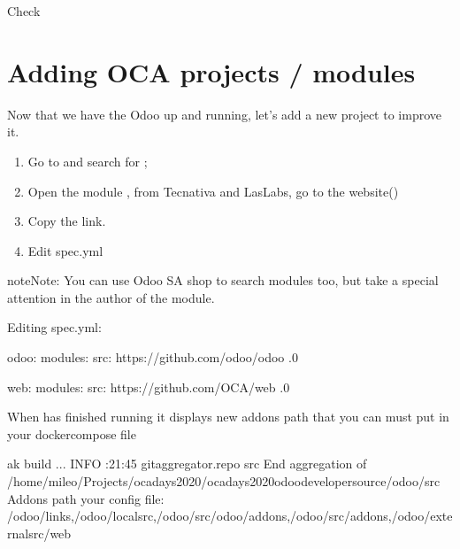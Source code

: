 \documentclass[letterpaper,10pt,english]{sphinxmanual}
\begin{document}
Check 


\section{Adding OCA projects / modules}
\label{\detokenize{technical:adding-oca-projects-modules}}
Now that we have the Odoo up and running, let’s add a new project to improve it.
\begin{enumerate}
%
\item {} 
Go to  and search for ;

\item {} 
Open the module , from Tecnativa and LasLabs, go to the website()

\item {} 
Copy the link.

\item {} 
Edit spec.yml

\end{enumerate}

\begin{sphinxadmonition}{note}{Note:}
You can use Odoo SA shop to search modules too, but take a special attention in the author of the module.
\end{sphinxadmonition}

Editing spec.yml:

%
\begin{sphinxVerbatim}[commandchars=\\\{\}]
odoo:
    modules: \PYG{o}{[}\PYG{o}{]}
    src: https://github.com/odoo/odoo .0

web:
    modules: \PYG{o}{[}\PYG{o}{]}
    src: https://github.com/OCA/web .0
\end{sphinxVerbatim}
\sphinxresetverbatimhllines

When  has finished running it displays new addons path that you can must put in your docker\sphinxhyphen{}compose file

%
\begin{sphinxVerbatim}[commandchars=\\\{\}]
ak build
\PYG{o}{[}...\PYG{o}{]}
INFO \PYG{o}{[}:21:45\PYG{o}{]} git\PYGZus{}aggregator.repo  src   End aggregation of /home/mileo/Projects/oca\PYGZhy{}days\PYGZhy{}2020/oca\PYGZhy{}days\PYGZhy{}2020\PYGZhy{}odoo\PYGZhy{}developer\PYGZhy{}source/odoo/src
Addons path  your config file:  /odoo/links,/odoo/local\PYGZhy{}src,/odoo/src/odoo/addons,/odoo/src/addons,/odoo/external\PYGZhy{}src/web
\end{sphinxVerbatim}
\sphinxresetverbatimhllines
\end{document}
